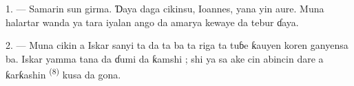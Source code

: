 %
%
%

\VUsaut{4.0mm}
\VUsaut{1.6mm}
\VUsaut{3.2mm}

\VUsaut{1.6mm}
\VUsaut{2.6mm}

\VUsaut{3.0mm}

1. --- Samarin sun girma. Ɗaya daga cikinsu, Ioannes, yana yin aure.
Muna halartar  wanda ya tara iyalan ango da amarya
kewaye da tebur ɗaya.

2. --- Muna cikin  a  Iskar sanyi
ta  da ta  ba ta riga ta tuɓe ƙauyen
koren ganyensa ba. Iskar yamma tana da ɗumi da ƙamshi ; shi ya sa ake
cin abincin dare a ƙarƙashin  \textsuperscript{(8)} kusa
da gona.


